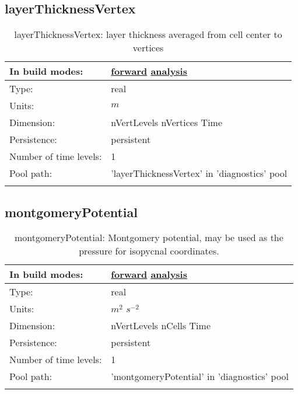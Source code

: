 \subsection[layerThicknessVertex]{layerThicknessVertex}
\label{subsec:var_sec_diagnostics_layerThicknessVertex}
\begin{center}
\begin{longtable}{| p{2.0in} | p{4.0in} |}
        \hline 
        In build modes: & \hyperref[subsec:forward_var_tab_diagnostics]{forward} \hyperref[subsec:analysis_var_tab_diagnostics]{analysis} \\
        \hline 
        Type: & real \\
        \hline 
        Units: & $m$ \\
        \hline 
        Dimension: & nVertLevels nVertices Time \\
        \hline 
        Persistence: & persistent \\
        \hline 
        Number of time levels: & 1 \\
        \hline 
            Pool path: & 'layerThicknessVertex' in 'diagnostics' pool
 \\
		 \hline 
    \caption{layerThicknessVertex: layer thickness averaged from cell center to vertices}
\end{longtable}
\end{center}
\subsection[montgomeryPotential]{montgomeryPotential}
\label{subsec:var_sec_diagnostics_montgomeryPotential}
\begin{center}
\begin{longtable}{| p{2.0in} | p{4.0in} |}
        \hline 
        In build modes: & \hyperref[subsec:forward_var_tab_diagnostics]{forward} \hyperref[subsec:analysis_var_tab_diagnostics]{analysis} \\
        \hline 
        Type: & real \\
        \hline 
        Units: & $m^2$ $s^{-2}$ \\
        \hline 
        Dimension: & nVertLevels nCells Time \\
        \hline 
        Persistence: & persistent \\
        \hline 
        Number of time levels: & 1 \\
        \hline 
            Pool path: & 'montgomeryPotential' in 'diagnostics' pool
 \\
		 \hline 
    \caption{montgomeryPotential: Montgomery potential, may be used as the pressure for isopycnal coordinates.}
\end{longtable}
\end{center}
